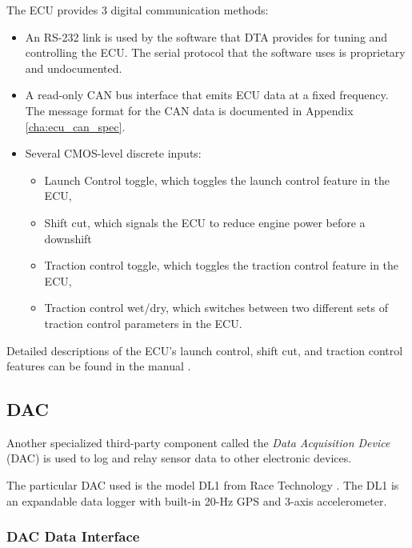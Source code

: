 The ECU provides 3 digital communication methods:
\begin{itemize}
  \item An RS-232 link is used by the software that DTA provides for tuning and controlling the ECU. The serial protocol that the software uses is proprietary and undocumented.
  \item A read-only CAN bus interface that emits ECU data at a fixed frequency. The message format for the CAN data is documented in Appendix \ref{cha:ecu_can_spec}.
  \item Several CMOS-level discrete inputs:
  \begin{itemize}
    \item Launch Control toggle, which toggles the launch control feature in the ECU,
    \item Shift cut, which signals the ECU to reduce engine power before a downshift
    \item Traction control toggle, which toggles the traction control feature in the ECU,
    \item Traction control wet/dry, which switches between two different sets of traction control parameters in the ECU.
  \end{itemize}
\end{itemize}

Detailed descriptions of the ECU's launch control, shift cut, and traction control features can be found in the manual \cite{s80pro}.
 

\subsection{DAC}

Another specialized third-party component called the \emph{Data Acquisition Device} (DAC) is used to log and relay sensor data to other electronic devices.

The particular DAC used is the model DL1 from Race Technology \cite{DL1Dsheet}. The DL1 is an expandable data logger with built-in 20-Hz GPS and 3-axis accelerometer.

\subsubsection{DAC Data Interface\label{sec:background_dac_data_interface}}

